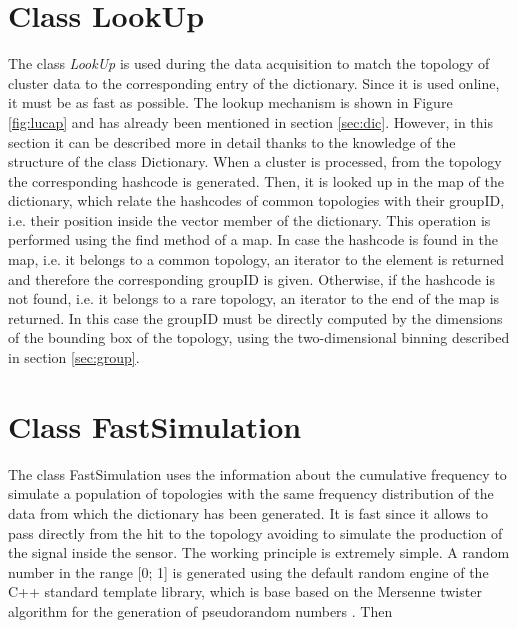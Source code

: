 \section{Class LookUp}
The class \textit{LookUp} is used during the data acquisition to match the topology of cluster data to the corresponding entry of the dictionary. Since it is used online, it must be as fast as possible. The lookup mechanism is shown in Figure \ref{fig:lucap} and has already been mentioned in section \ref{sec:dic}. However, in this section it can be described more in detail thanks to the knowledge of the structure of the class Dictionary. When a cluster is processed, from the topology the corresponding hashcode is generated. Then, it is looked up in the map of the dictionary, which relate the hashcodes of common topologies with their groupID, i.e. their position inside the vector member of the dictionary. This operation is performed using the find method of a map. In case the hashcode is found in the map, i.e. it belongs to a common topology, an iterator to the element is returned and therefore the corresponding groupID is given. Otherwise, if the hashcode is not found, i.e. it belongs to a rare topology, an iterator to the end of the map is returned. In this case the groupID must be directly computed by the dimensions of the bounding box of the topology, using the two-dimensional binning described in section \ref{sec:group}.
\section{Class FastSimulation}
The class FastSimulation uses the information about the cumulative frequency to simulate a population of topologies with the same frequency distribution of the data from which the dictionary has been generated. It is fast since it allows to pass directly from the hit to the topology avoiding to simulate the production of the signal inside the sensor. The working principle is extremely simple. A random number in the range [0; 1] is generated using the default random engine of the C++ standard template library, which is base based on the Mersenne twister algorithm for the generation of pseudorandom numbers \cite{mersenne}. Then 
